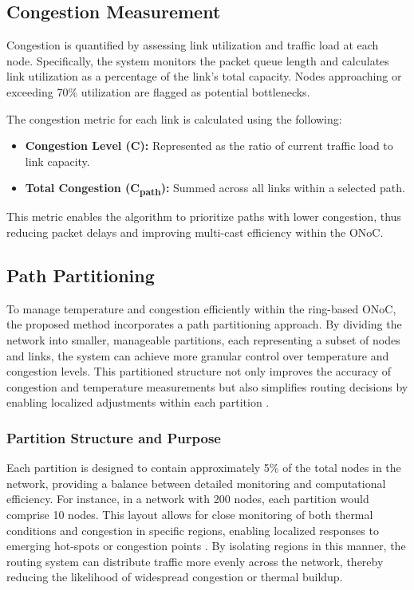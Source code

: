 \documentclass[conference]{IEEEtran}
\begin{document}
\subsection{Congestion Measurement}
Congestion is quantified by assessing link utilization and traffic load at each node. Specifically, the system monitors the packet queue length and calculates link utilization as a percentage of the link’s total capacity. Nodes approaching or exceeding 70\% utilization are flagged as potential bottlenecks.

The congestion metric for each link is calculated using the following:
\begin{itemize}
    \item \textbf{Congestion Level (C):} Represented as the ratio of current traffic load to link capacity.
    \item \textbf{Total Congestion (C\textsubscript{path}):} Summed across all links within a selected path.
\end{itemize}

This metric enables the algorithm to prioritize paths with lower congestion, thus reducing packet delays and improving multi-cast efficiency within the ONoC.

\subsection{Path Partitioning}
To manage temperature and congestion efficiently within the ring-based ONoC, the proposed method incorporates a path partitioning approach. By dividing the network into smaller, manageable partitions, each representing a subset of nodes and links, the system can achieve more granular control over temperature and congestion levels. This partitioned structure not only improves the accuracy of congestion and temperature measurements but also simplifies routing decisions by enabling localized adjustments within each partition \cite{chu2019partitioning}.

\subsubsection{Partition Structure and Purpose}
Each partition is designed to contain approximately 5\% of the total nodes in the network, providing a balance between detailed monitoring and computational efficiency. For instance, in a network with 200 nodes, each partition would comprise 10 nodes. This layout allows for close monitoring of both thermal conditions and congestion in specific regions, enabling localized responses to emerging hot-spots or congestion points \cite{liu2019wavelength}. By isolating regions in this manner, the routing system can distribute traffic more evenly across the network, thereby reducing the likelihood of widespread congestion or thermal buildup.
\end{document}
